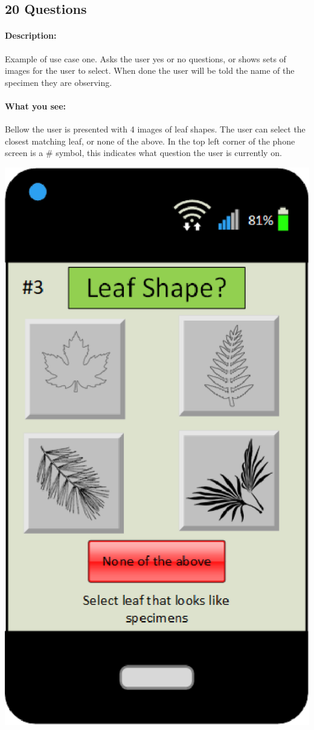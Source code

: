\documentclass[a4paper]{article}
\begin{document}
\subsection{20 Questions}
\paragraph{Description:}
Example of use case one. Asks the user yes or no questions, or shows sets of images for the user to select. When done the user will be told the name of the specimen they are observing.
\paragraph{What you see:}
Bellow the user is presented with 4 images of leaf shapes. The user can select the closest matching leaf, or none of the above. In the top left corner of the phone screen is a \# symbol, this indicates what question the user is currently on.
\begin{center}\includegraphics[scale=.8]{20Questions.eps}\end{center}
\pagebreak
\end{document}
